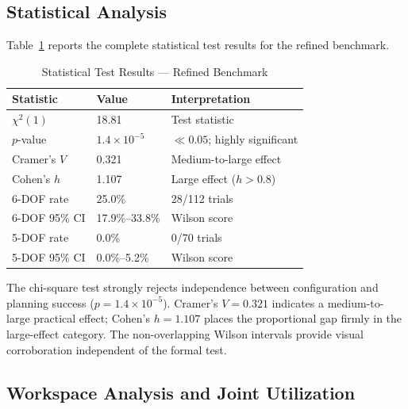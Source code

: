 \documentclass[conference]{IEEEtran}
\begin{document}
	\subsection{Statistical Analysis}
	
	Table~\ref{tab:stats} reports the complete statistical test
	results for the refined benchmark.
	
	\begin{table}[t]
		\centering
		\caption{Statistical Test Results — Refined Benchmark}
		\label{tab:stats}
		\renewcommand{\arraystretch}{1.2}
		\small
		\begin{tabular}{lll}
			\toprule
			\textbf{Statistic} & \textbf{Value} & \textbf{Interpretation} \\
			\midrule
			$\chi^2(1)$        & 18.81                   & Test statistic \\
			$p$-value          & $1.4\times10^{-5}$      & $\ll 0.05$; highly significant \\
			Cramer's $V$       & 0.321                   & Medium-to-large effect \\
			Cohen's $h$        & 1.107                   & Large effect ($h > 0.8$) \\
			6-DOF rate         & 25.0\%                  & 28/112 trials \\
			6-DOF 95\% CI      & 17.9\%--33.8\%          & Wilson score \\
			5-DOF rate         & 0.0\%                   & 0/70 trials \\
			5-DOF 95\% CI      & 0.0\%--5.2\%            & Wilson score \\
			\bottomrule
		\end{tabular}
	\end{table}
	
	The chi-square test strongly rejects independence between
	configuration and planning success ($p = 1.4\times10^{-5}$).
	Cramer's $V = 0.321$ indicates a medium-to-large practical
	effect; Cohen's $h = 1.107$ places the proportional gap firmly
	in the large-effect category. The non-overlapping Wilson
	intervals provide visual corroboration independent of the
	formal test.
	
	\subsection{Workspace Analysis and Joint Utilization}
	
\end{document}
